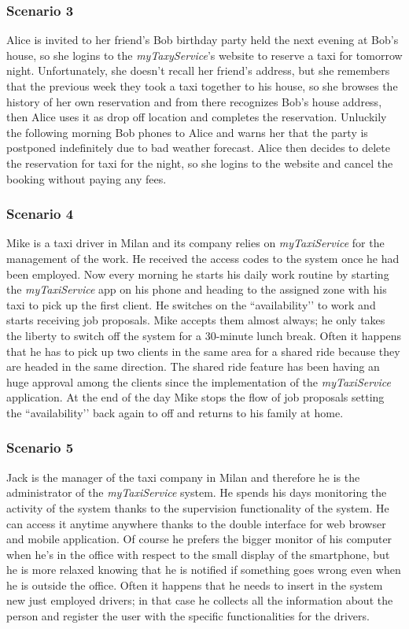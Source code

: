 \documentclass[a4paper,11pt]{report} %
\newcommand{\mts}{\mbox{\normalfont\itshape myTaxiService}}
\begin{document}
	\subsubsection{Scenario 3} Alice is invited to her friend’s Bob birthday party held the next evening at Bob’s house, so she logins to the {\em myTaxyService}'s website to reserve a taxi for tomorrow night. Unfortunately, she doesn’t recall her friend’s address, but she remembers that the previous week they took a taxi together to his house, so she browses the history of her own reservation and from there recognizes Bob’s house address, then Alice uses it as drop off location and completes the reservation. Unluckily the following morning Bob phones to Alice and warns her that the party is postponed indefinitely due to bad weather forecast. Alice then decides to delete the reservation for taxi for the night, so she logins to the website and cancel the booking without paying any fees.
	
	\subsubsection{Scenario 4} Mike is a taxi driver in Milan and its company relies on \mts{} for the management of the work. He received the access codes to the system once he had been employed. Now every morning he starts his daily work routine by starting the \mts{} app on his phone and heading to the assigned zone with his taxi to pick up the first client. He switches on the ``availability’’ to work and starts receiving job proposals. Mike accepts them almost always; he only takes the liberty to switch off the system for a 30-minute lunch break. Often it happens that he has to pick up two clients in the same area for a shared ride because they are headed in the same direction. The shared ride feature has been having an huge approval among the clients since the implementation of the \mts{} application. At the end of the day Mike stops the flow of job proposals setting the ``availability’’ back again to off and returns to his family at home.
	
	\subsubsection{Scenario 5} Jack is the manager of the taxi company in Milan and therefore he is the administrator of the \mts{} system. He spends his days monitoring the activity of the system thanks to the supervision functionality of the system. He can access it anytime anywhere thanks to the double interface for web browser and mobile application. Of course he prefers the bigger monitor of his computer when he’s in the office with respect to the small display of the smartphone, but he is more relaxed knowing that he is notified if something goes wrong even when he is outside the office. Often it happens that he needs to insert in the system new just employed drivers; in that case he collects all the information about the person and register the user with the specific functionalities for the drivers.
	
\end{document}
